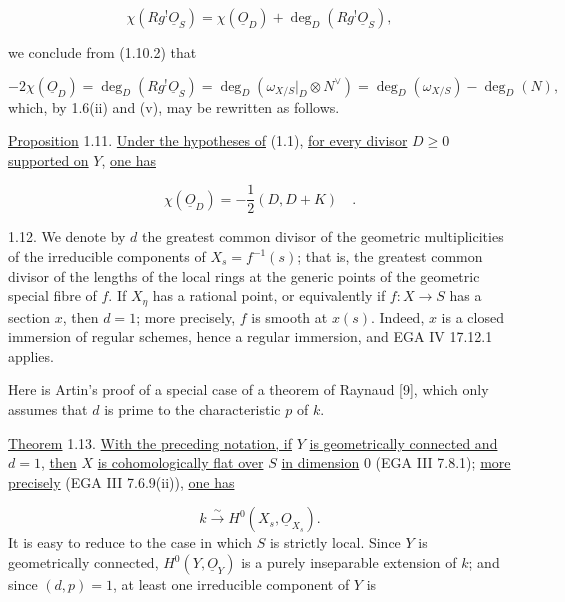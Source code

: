 \begin{equation*}
\chi(Rg^{!}\underline{O}_S)
=\chi(\underline{O}_D)+\deg_D(Rg^{!}\underline{O}_S),
\end{equation*}


we conclude from (1.10.2) that

\begin{equation*}
-2\chi(\underline{O}_D)
=\deg_D(Rg^{!}\underline{O}_S)
=\deg_D(\omega_{X/S}|_D\otimes N^{\vee})
=\deg_D(\omega_{X/S})-\deg_D(N),
\end{equation*}
which, by 1.6(ii) and (v), may be rewritten as follows.

\underline{Proposition} 1.11. \underline{Under the hypotheses of} (1.1),
\underline{for every divisor} $D\geq0$ \underline{supported on} $Y$,
\underline{one has}

\begin{equation*}
\chi(\underline{O}_D)=-\frac12(D,D+K) \quad .
\end{equation*}

1.12. We denote by $d$ the greatest common divisor of the geometric
multiplicities of the irreducible components of $X_s=f^{-1}(s)$; that is, the
greatest common divisor of the lengths of the local rings at the generic points
of the geometric special fibre of $f$.  If $X_\eta$ has a rational point, or
equivalently if $f:X\longrightarrow S$ has a section $x$, then $d=1$; more
precisely, $f$ is smooth at $x(s)$.  Indeed, $x$ is a closed immersion of regular
schemes, hence a regular immersion, and EGA IV 17.12.1 applies.

Here is Artin's proof of a special case of a theorem of Raynaud [9], which only
assumes that $d$ is prime to the characteristic $p$ of $k$.

\underline{Theorem} 1.13. \underline{With the preceding notation, if} $Y$
\underline{is geometrically connected and} $d=1$, \underline{then} $X$
\underline{is cohomologically flat over} $S$ \underline{in dimension} $0$
(EGA III 7.8.1); \underline{more precisely} (EGA III 7.6.9(ii)),
\underline{one has}

\begin{equation*}
k\xrightarrow{\;\sim\;}H^0(X_s,\underline{O}_{X_s}).
\end{equation*}
It is easy to reduce to the case in which $S$ is strictly local.  Since $Y$ is
geometrically connected, $H^0(Y,\underline{O}_Y)$ is a purely inseparable
extension of $k$; and since $(d,p)=1$, at least one irreducible component of $Y$
is

